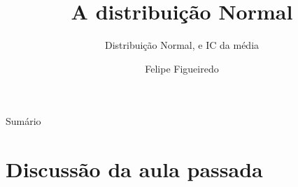 \documentclass{beamer}
\title%
{A distribuição Normal}
\subtitle
{Distribuição Normal, e IC da média} %
\author%
{Felipe Figueiredo}%
\institute[] %
{
}
\date%
{}
\begin{document}
\begin{frame}
  \titlepage
\end{frame}

\begin{frame}{Sumário}
  \tableofcontents
\end{frame}








\section{Discussão da aula passada}
\end{document}
